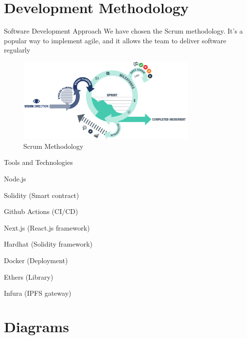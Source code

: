 \documentclass[aspectratio=169,usenames,dvipsnames,pdftex]{beamer}
\begin{document}
  \section{Development Methodology}

  \begin{frame}{Software Development Approach}
    We have chosen the Scrum methodology. It’s a popular way to implement agile, and it allows the team to deliver software regularly
    \begin{figure}
      \includegraphics[width=0.8\textwidth]{agile-scrum.png}
      \caption{Scrum Methodology}
    \end{figure}
  \end{frame}

  \begin{frame}{Tools and Technologies}
    \begin{itemize}
      \begin{multicols}{2}
      \item \faNode{} Node.js
      \item Solidity (Smart contract)
      \item \faCodeBranch{} Github Actions (CI/CD)
      \item \faReact{} Next.js (React.js framework)
      \item Hardhat (Solidity framework)
      \item \faDocker{} Docker (Deployment)
      \item Ethers (Library)
      \item Infura (IPFS gateway)
      \end{multicols}
    \end{itemize}
  \end{frame}

  \section{Diagrams}
\end{document}
